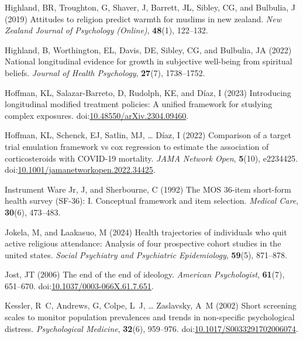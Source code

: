 \documentclass[
  single column]{article}
\newlength{\cslhangindent}
\newenvironment{CSLReferences}[2] %
 {\begin{list}{}{%
  \setlength{\itemindent}{0pt}
  \setlength{\leftmargin}{0pt}
  \setlength{\parsep}{0pt}
  \ifodd #1
   \setlength{\leftmargin}{\cslhangindent}
   \setlength{\itemindent}{-1\cslhangindent}
  \fi
  \setlength{\itemsep}{#2\baselineskip}}}
 {\end{list}}
\begin{document}
\begin{CSLReferences}{1}{0}
Highland, BR, Troughton, G, Shaver, J, Barrett, JL, Sibley, CG, and
Bulbulia, J (2019) Attitudes to religion predict warmth for muslims in
new zealand. \emph{New Zealand Journal of Psychology (Online)},
\textbf{48}(1), 122--132.

Highland, B, Worthington, EL, Davis, DE, Sibley, CG, and Bulbulia, JA
(2022) National longitudinal evidence for growth in subjective
well-being from spiritual beliefs. \emph{Journal of Health Psychology},
\textbf{27}(7), 1738--1752.

Hoffman, KL, Salazar-Barreto, D, Rudolph, KE, and Díaz, I (2023)
Introducing longitudinal modified treatment policies: A unified
framework for studying complex exposures.
doi:\href{https://doi.org/10.48550/arXiv.2304.09460}{10.48550/arXiv.2304.09460}.

Hoffman, KL, Schenck, EJ, Satlin, MJ, \ldots{} Díaz, I (2022) Comparison
of a target trial emulation framework vs cox regression to estimate the
association of corticosteroids with COVID-19 mortality. \emph{JAMA
Network Open}, \textbf{5}(10), e2234425.
doi:\href{https://doi.org/10.1001/jamanetworkopen.2022.34425}{10.1001/jamanetworkopen.2022.34425}.

Instrument Ware Jr, J, and Sherbourne, C (1992) The MOS 36-item
short-form health survey (SF-36): I. Conceptual framework and item
selection. \emph{Medical Care}, \textbf{30}(6), 473--483.

Jokela, M, and Laakasuo, M (2024) Health trajectories of individuals who
quit active religious attendance: Analysis of four prospective cohort
studies in the united states. \emph{Social Psychiatry and Psychiatric
Epidemiology}, \textbf{59}(5), 871--878.

Jost, JT (2006) The end of the end of ideology. \emph{American
Psychologist}, \textbf{61}(7), 651--670.
doi:\href{https://doi.org/10.1037/0003-066X.61.7.651}{10.1037/0003-066X.61.7.651}.

Kessler, R~C, Andrews, G, Colpe, L~J, \ldots{} Zaslavsky, A~M (2002)
Short screening scales to monitor population prevalences and trends in
non-specific psychological distress. \emph{Psychological Medicine},
\textbf{32}(6), 959--976.
doi:\href{https://doi.org/10.1017/S0033291702006074}{10.1017/S0033291702006074}.


\end{CSLReferences}
\end{document}
